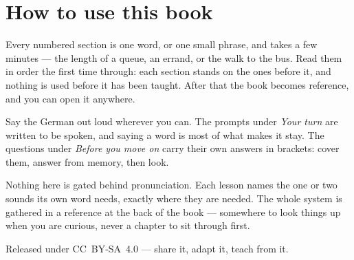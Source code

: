 \documentclass[11pt,twoside]{book}
\begin{document}
\section*{How to use this book}

Every numbered section is one word, or one small phrase, and takes a few
minutes --- the length of a queue, an errand, or the walk to the bus. Read them
in order the first time through: each section stands on the ones before it, and
nothing is used before it has been taught. After that the book becomes
reference, and you can open it anywhere.

Say the German out loud wherever you can. The prompts under \emph{Your turn}
are written to be spoken, and saying a word is most of what makes it stay. The
questions under \emph{Before you move on} carry their own answers in brackets:
cover them, answer from memory, then look.

Nothing here is gated behind pronunciation. Each lesson names the one or two
sounds its own word needs, exactly where they are needed. The whole system is
gathered in a reference at the back of the book --- somewhere to look things up
when you are curious, never a chapter to sit through first.

Released under CC~BY-SA~4.0 --- share it, adapt it, teach from it.

\tableofcontents

\mainmatter


\end{document}
